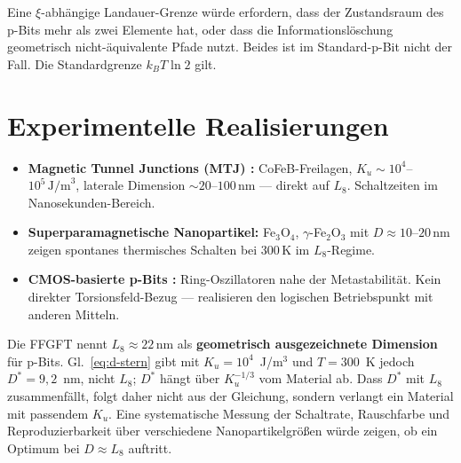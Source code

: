 	\begin{important}
		Eine $\xi$-abhängige Landauer-Grenze würde erfordern, dass der
		Zustandsraum des p-Bits mehr als zwei Elemente hat, oder dass
		die Informationslöschung geometrisch nicht-äquivalente Pfade nutzt.
		Beides ist im Standard-p-Bit nicht der Fall.
		Die Standardgrenze $k_BT \ln 2$ gilt.
	\end{important}
	
	\section{Experimentelle Realisierungen}
	\label{sec:experiment}
	
	\begin{itemize}
		\item \textbf{Magnetic Tunnel Junctions (MTJ) \cite{Borders2019}:}
		CoFeB-Freilagen, $K_u \sim 10^4$--$10^5\,\text{J/m}^3$,
		laterale Dimension $\sim 20$--$100\,\text{nm}$ --- direkt auf $L_8$.
		Schaltzeiten im Nanosekunden-Bereich.
		
		\item \textbf{Superparamagnetische Nanopartikel:}
		Fe$_3$O$_4$, $\gamma$-Fe$_2$O$_3$ mit $D \approx 10$--$20\,\text{nm}$
		zeigen spontanes thermisches Schalten bei 300\,K im
		$L_8$-Regime.
		
		\item \textbf{CMOS-basierte p-Bits \cite{Aadit2022}:}
		Ring-Oszillatoren nahe der Metastabilität. Kein direkter
		Torsionsfeld-Bezug --- realisieren den logischen Betriebspunkt
		mit anderen Mitteln.
	\end{itemize}
	
	\begin{keypoint}
		Die FFGFT nennt $L_8 \approx 22\,\text{nm}$ als \textbf{geometrisch
		ausgezeichnete Dimension} für p-Bits. Gl.~\eqref{eq:d-stern} gibt mit
		$K_u = 10^4$~J/m$^3$ und $T = 300$~K jedoch $D^* = 9{,}2$~nm, nicht $L_8$;
		$D^*$ hängt über $K_u^{-1/3}$ vom Material ab. Dass $D^*$ mit $L_8$
		zusammenfällt, folgt daher nicht aus der Gleichung, sondern verlangt ein
		Material mit passendem $K_u$.
		Eine systematische Messung der Schaltrate, Rauschfarbe und
		Reproduzierbarkeit über verschiedene Nanopartikelgrößen würde
		zeigen, ob ein Optimum bei $D \approx L_8$ auftritt.
	\end{keypoint}
	
